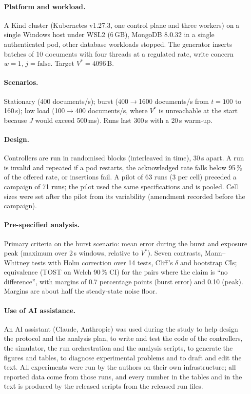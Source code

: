\documentclass[smallextended]{svjour3}
\begin{document}
\paragraph{Platform and workload.}
A Kind cluster (Kubernetes v1.27.3, one control plane and three workers) on a single Windows host under WSL2 (6\,GB), MongoDB 8.0.32 in a single
authenticated pod, other database workloads stopped. The generator inserts batches of 10 documents with four threads at a regulated rate,
write concern $w=1$, $j=\text{false}$. Target $V^*=4096$\,B.
\paragraph{Scenarios.} Stationary (400 documents/s); burst (400$\to$1600 documents/s from $t=100$ to 160\,s); low load (100$\to$400 documents/s, where $V^*$ is
unreachable at the start because $J$ would exceed 500\,ms). Runs last 300\,s with a 20\,s warm-up.
\paragraph{Design.} Controllers are run in randomised blocks (interleaved in time), 30\,s apart. A run is invalid and repeated if a pod restarts,
the acknowledged rate falls below 95\,\% of the offered rate, or insertions fail. A pilot of 63 runs (3 per cell) preceded a campaign of 71 runs; the pilot
used the same specifications and is pooled. Cell sizes were set after the pilot from its variability (amendment recorded before the campaign).
\paragraph{Pre-specified analysis.}
Primary criteria on the burst scenario: mean error during the burst and exposure peak (maximum over 2\,s windows, relative to $V^*$).
Seven contrasts, Mann--Whitney tests with Holm correction over 14 tests, Cliff's $\delta$ and bootstrap CIs; equivalence (TOST on Welch 90\,\% CI)
for the pairs where the claim is ``no difference'', with margins of 0.7 percentage points (burst error) and 0.10 (peak). Margins are about
half the steady-state noise floor.

\paragraph{Use of AI assistance.}
An AI assistant (Claude, Anthropic) was used during the study to help design the protocol and the analysis plan, to write and test the code of the controllers, the simulator, the run orchestration and the analysis scripts,
to generate the figures and tables, to diagnose experimental problems and to draft and edit the text. All experiments were run by the authors on their own infrastructure; all reported data come from those runs, and every number in the tables
and in the text is produced by the released scripts from the released run files.
\end{document}
